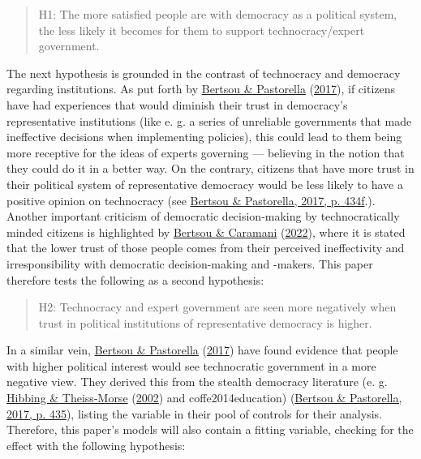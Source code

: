 \documentclass[
  12pt,
  english,
]{article}
\begin{document}
\begin{quote}
H1: The more satisfied people are with democracy as a political system,
the less likely it becomes for them to support technocracy/expert
government.
\end{quote}

The next hypothesis is grounded in the contrast of technocracy and
democracy regarding institutions. As put forth by
\protect\hyperlink{ref-bertsou2017technocratic}{Bertsou \& Pastorella}
(\protect\hyperlink{ref-bertsou2017technocratic}{2017}), if citizens
have had experiences that would diminish their trust in democracy's
representative institutions (like e. g. a series of unreliable
governments that made ineffective decisions when implementing policies),
this could lead to them being more receptive for the ideas of experts
governing --- believing in the notion that they could do it in a better
way. On the contrary, citizens that have more trust in their political
system of representative democracy would be less likely to have a
positive opinion on technocracy (see
\protect\hyperlink{ref-bertsou2017technocratic}{Bertsou \& Pastorella,
2017, p. 434f}.). Another important criticism of democratic
decision-making by technocratically minded citizens is highlighted by
\protect\hyperlink{ref-bertsou2022people}{Bertsou \& Caramani}
(\protect\hyperlink{ref-bertsou2022people}{2022}), where it is stated
that the lower trust of those people comes from their perceived
ineffectivity and irresponsibility with democratic decision-making and
-makers. This paper therefore tests the following as a second
hypothesis:

\begin{quote}
H2: Technocracy and expert government are seen more negatively when
trust in political institutions of representative democracy is higher.
\end{quote}

In a similar vein,
\protect\hyperlink{ref-bertsou2017technocratic}{Bertsou \& Pastorella}
(\protect\hyperlink{ref-bertsou2017technocratic}{2017}) have found
evidence that people with higher political interest would see
technocratic government in a more negative view. They derived this from
the stealth democracy literature (e. g.
\protect\hyperlink{ref-hibbing2002stealth}{Hibbing \& Theiss-Morse}
(\protect\hyperlink{ref-hibbing2002stealth}{2002}) and
coffe2014education)
(\protect\hyperlink{ref-bertsou2017technocratic}{Bertsou \& Pastorella,
2017, p. 435}), listing the variable in their pool of controls for their
analysis. Therefore, this paper's models will also contain a fitting
variable, checking for the effect with the following hypothesis:
\end{document}
